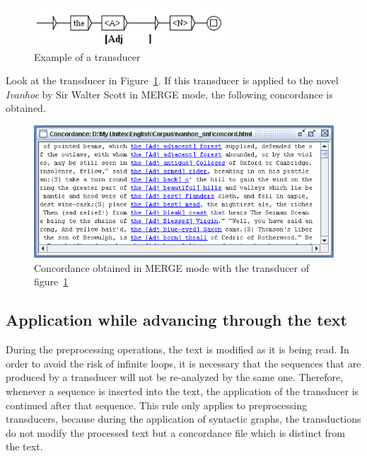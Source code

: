 \begin{figure}[!h]
\begin{center}
\includegraphics[width=7.2cm]{resources/img/fig6-22.png}
\caption{Example of a transducer\label{fig-transducer-example}}
\end{center}
\end{figure}

\bigskip
\noindent Look at the transducer in Figure~\ref{fig-transducer-example}.
If this transducer is applied to the novel \textit{Ivanhoe} by Sir Walter Scott
in MERGE mode, the following concordance is obtained.

\begin{figure}[!h]
\begin{center}
\includegraphics[width=14.4cm]{resources/img/fig6-23.png}
\caption{Concordance obtained in MERGE mode with the transducer of
figure~\ref{fig-transducer-example}}
\end{center}
\end{figure}

\subsection{Application while advancing through the text}
During the preprocessing operations, the text is modified as it is being read.
In order to avoid the risk of infinite loops, it is necessary that the
sequences that are produced by a transducer will not be re-analyzed by the same one.
Therefore, whenever a sequence is inserted into the text, the application of the
transducer is continued after that sequence. This rule
only applies to  preprocessing transducers, because during the
application of syntactic graphs, the transductions do not modify the processed
text but a concordance file which is distinct from the text.

